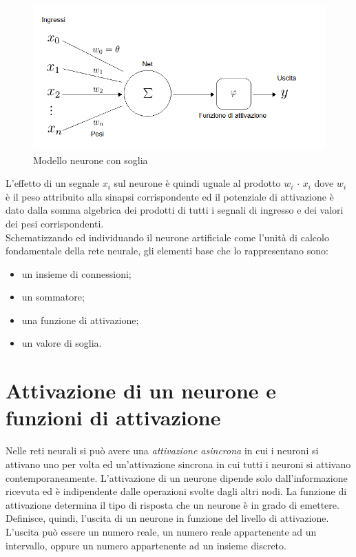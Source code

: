 \documentclass[12pt,a4paper,oneside]{book}
\begin{document}
		\begin{figure}[h!]
			\centering
			\includegraphics[width=1\linewidth]{IMMAGINI/palla3}
			\caption{ Modello neurone con soglia }
			\label{fig:palla3}
		\end{figure}
		
		L'effetto di un segnale $ x_{i} $ sul neurone è quindi uguale al prodotto 
		$w_{i}$ $\cdot$ $x_{i}$ dove $w_{i}$ è il peso attribuito alla sinapsi corrispondente ed il potenziale di attivazione è dato dalla somma algebrica dei prodotti di tutti i segnali di ingresso e dei valori dei pesi corrispondenti.\\
	 	Schematizzando ed individuando il neurone artificiale come l'unità di calcolo fondamentale della rete neurale, gli elementi base che lo rappresentano sono:
		
		\begin{itemize}
			\item un insieme di connessioni;
			\item un sommatore;
			\item una funzione di attivazione;
			\item un valore di soglia.
		\end{itemize}
		
		
		\clearpage
	\section{Attivazione di un neurone e funzioni di attivazione}
		
		Nelle reti neurali si può avere una \emph{attivazione asincrona} in cui i neuroni si attivano uno per volta ed un'{attivazione sincrona} in cui tutti i neuroni si attivano contemporaneamente. L'attivazione di un neurone dipende solo dall'informazione ricevuta ed è indipendente dalle operazioni svolte dagli altri nodi. La funzione di attivazione determina il tipo di risposta che un neurone è in grado di emettere. Definisce, quindi, l’uscita di un neurone in funzione del livello di attivazione. L'uscita può essere un numero reale, un numero reale appartenente ad un intervallo, oppure un numero appartenente ad un insieme discreto.\\
		
\end{document}
